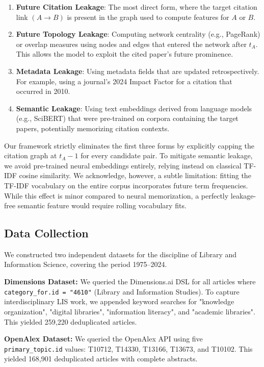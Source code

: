 \documentclass[11pt,a4paper]{article}
\begin{document}
\begin{enumerate}
    \item \textbf{Future Citation Leakage}: The most direct form, where the target citation link $(A \to B)$ is present in the graph used to compute features for $A$ or $B$.
    \item \textbf{Future Topology Leakage}: Computing network centrality (e.g., PageRank) or overlap measures using nodes and edges that entered the network after $t_A$. This allows the model to exploit the cited paper's future prominence.
    \item \textbf{Metadata Leakage}: Using metadata fields that are updated retrospectively. For example, using a journal's 2024 Impact Factor for a citation that occurred in 2010.
    \item \textbf{Semantic Leakage}: Using text embeddings derived from language models (e.g., SciBERT) that were pre-trained on corpora containing the target papers, potentially memorizing citation contexts.
\end{enumerate}

Our framework strictly eliminates the first three forms by explicitly capping the citation graph at $t_A - 1$ for every candidate pair. To mitigate semantic leakage, we avoid pre-trained neural embeddings entirely, relying instead on classical TF-IDF cosine similarity. We acknowledge, however, a subtle limitation: fitting the TF-IDF vocabulary on the entire corpus incorporates future term frequencies. While this effect is minor compared to neural memorization, a perfectly leakage-free semantic feature would require rolling vocabulary fits.

\subsection{Data Collection}
We constructed two independent datasets for the discipline of Library and Information Science, covering the period 1975--2024.

\textbf{Dimensions Dataset:} We queried the Dimensions.ai DSL for all articles where \texttt{category\_for.id = "4610"} (Library and Information Studies). To capture interdisciplinary LIS work, we appended keyword searches for "knowledge organization", "digital libraries", "information literacy", and "academic libraries". This yielded 259,220 deduplicated articles.

\textbf{OpenAlex Dataset:} We queried the OpenAlex API using five \texttt{primary\_topic.id} values: T10712, T14330, T13166, T13673, and T10102. This yielded 168,901 deduplicated articles with complete abstracts.
\end{document}
